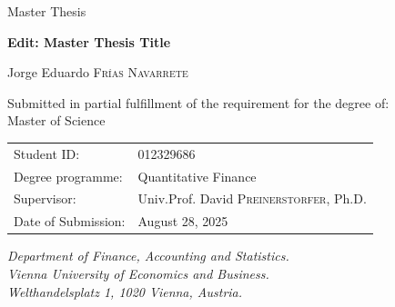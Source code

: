 \documentclass[
  12pt,
  a4paper,
  openany]{scrbook}
\begin{document}
\begin{center}
    \large Master Thesis \\
    \vspace{1cm}

    \textbf{\huge Edit: Master Thesis Title} \\
    \vspace{0.5cm}

        \LARGE Jorge Eduardo \textsc{Frías Navarrete} \\
    \vspace{0.5cm}
        \vspace{2cm}
    
    \normalsize Submitted in partial fulfillment of the requirement for the degree of: \\
    \LARGE Master of Science \\
\vspace{2cm}

\normalsize
    \begin{tabular}{ll}
        Student ID: & 012329686 \\
        Degree programme: & Quantitative Finance \\
        Supervisor: & Univ.Prof. David \textsc{Preinerstorfer}, Ph.D. \\
        Date of Submission: & August 28, 2025
    \end{tabular}
    \vspace{2cm}
    
    \textit{
      Department of Finance, Accounting and Statistics. \\
      Vienna University of Economics and Business. \\
      Welthandelsplatz 1, 1020 Vienna, Austria.
    }

\end{center}

\restoregeometry


% 
\end{document}
